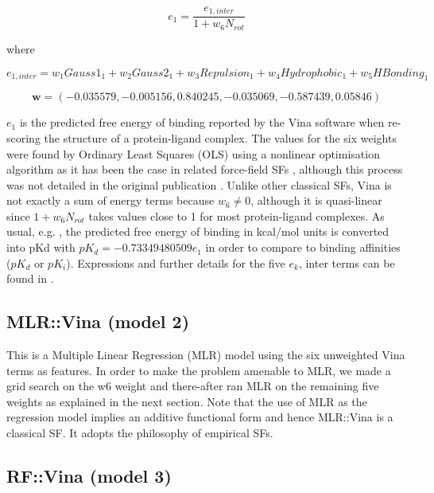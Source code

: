 \begin{equation}
\label{rfscore3:e_1}
e_1=\frac{e_{1,inter}}{1+w_6N_{rot}}
\end{equation}

where

\begin{equation}
\label{rfscore3:e_1_inter}
e_{1,inter}=w_1Gauss1_1+w_2Gauss2_1+w_3Repulsion_1+w_4Hydrophobic_1+w_5HBonding_1
\end{equation}

\begin{equation}
\label{rfscore3:w}
\mathbf w=(-0.035579,-0.005156,0.840245,-0.035069,-0.587439,0.05846)
\end{equation}

$e_1$ is the predicted free energy of binding reported by the Vina software when re-scoring the structure of a protein-ligand complex. The values for the six weights were found by Ordinary Least Squares (OLS) using a nonlinear optimisation algorithm as it has been the case in related force-field SFs \citep{1454}, although this process was not detailed in the original publication \citep{595}. Unlike other classical SFs, Vina is not exactly a sum of energy terms because $w_6\neq0$, although it is quasi-linear since $1 + w_6N_{rot}$ takes values close to 1 for most protein-ligand complexes. As usual, e.g. \citep{1362}, the predicted free energy of binding in kcal/mol units is converted into pKd with $pK_d=-0.73349480509e_1$ in order to compare to binding affinities ($pK_d$ or $pK_i$). Expressions and further details for the five $e_k$, inter terms can be found in \citep{595,1362}.

\subsection{MLR::Vina (model 2)}

This is a Multiple Linear Regression (MLR) model using the six unweighted Vina terms as features. In order to make the problem amenable to MLR, we made a grid search on the w6 weight and there-after ran MLR on the remaining five weights as explained in the next section. Note that the use of MLR as the regression model implies an additive functional form and hence MLR::Vina is a classical SF. It adopts the philosophy of empirical SFs.

\subsection{RF::Vina (model 3)}


